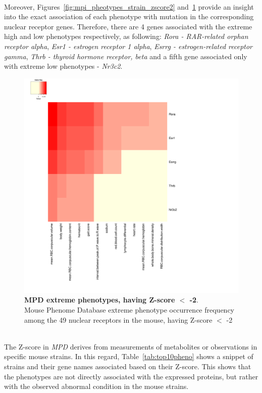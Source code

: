 \documentclass[fleqn,11pt]{SelfArx}
\begin{document}
~~~~~~~\\
Moreover, Figures~\ref{fig:mpi_pheotypes_strain_zscore2} and~\ref{fig:mpi_pheotypes_strain_zscore2_neg} provide an insight into the exact association of each phenotype with mutation in the corresponding nuclear receptor genes. Therefore, there are 4 genes associated with the extreme high and low phenotypes respectively, as following: \textit{Rora - RAR-related orphan receptor alpha}, \textit{Esr1 - estrogen receptor 1 alpha}, \textit{Esrrg - estrogen-related receptor gamma}, \textit{Thrb - thyroid hormone receptor, beta} and a fifth gene associated only with extreme low phenotypes - \textit{Nr3c2}. 
\begin{figure}[H]
	\centering
	\includegraphics[width=\linewidth]{pics/mpi_phenotypes_nr_zscore2_neg.pdf}
	\captionsetup{margin=12pt,format=plain,font=footnotesize,labelfont=bf}
 	\caption{\footnotesize{\textbf{MPD extreme phenotypes, having Z-score $<$ -2}. 
	~~~~~~~\\
	Mouse Phenome Database extreme phenotype occurrence frequency among the 49 nuclear receptors in the mouse, having Z-score $<$ -2}}
	\label{fig:mpi_pheotypes_strain_zscore2_neg}
\end{figure}
~~~~~~~\\
The Z-score in \textit{MPD} derives from measurements of metabolites or observations in specific mouse strains. In this regard, Table~\ref{tab:top10pheno} shows a snippet of strains and their gene names associated based on their Z-score. This shows that the phenotypes are not directly associated with the expressed proteins, but rather with the observed abnormal condition in the mouse strains. 
\end{document}
